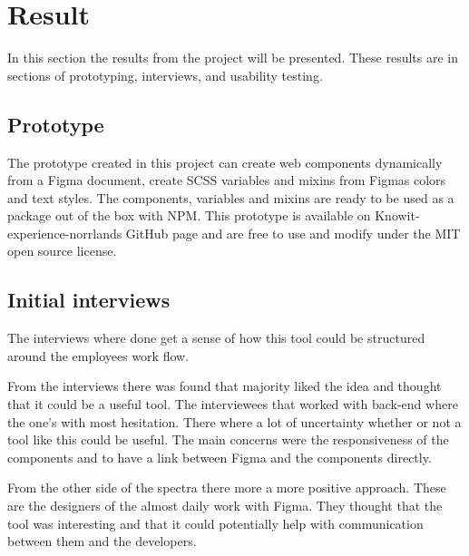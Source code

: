\section{Result}


In this section the results from the project will be presented. These results are in sections of prototyping, interviews, and usability testing.

\subsection{Prototype}%
\label{sub:Prototype}
The prototype created in this project can create web components dynamically from a Figma document, create SCSS variables and mixins from Figmas colors and text styles. The components, variables and mixins are ready to be used as a package out of the box with NPM. This prototype is available on Knowit-experience-norrlands GitHub page and are free to use and modify under the MIT open source license.

\subsection{Initial interviews}%
\label{sub:Initial interviews}
The interviews where done get a sense of how this tool could be structured around the employees work flow.

From the interviews there was found that majority liked the idea and thought that it could be a useful tool. The interviewees that worked with back-end where the one's with most hesitation. There where a lot of uncertainty whether or not a tool like this could be useful. The main concerns were the responsiveness of the components and to have a link between Figma and the components directly.

From the other side of the  spectra there more a more positive approach. These are the designers of the almost daily work with Figma. They thought that the tool was interesting and that it could potentially help with communication between them and the developers.

